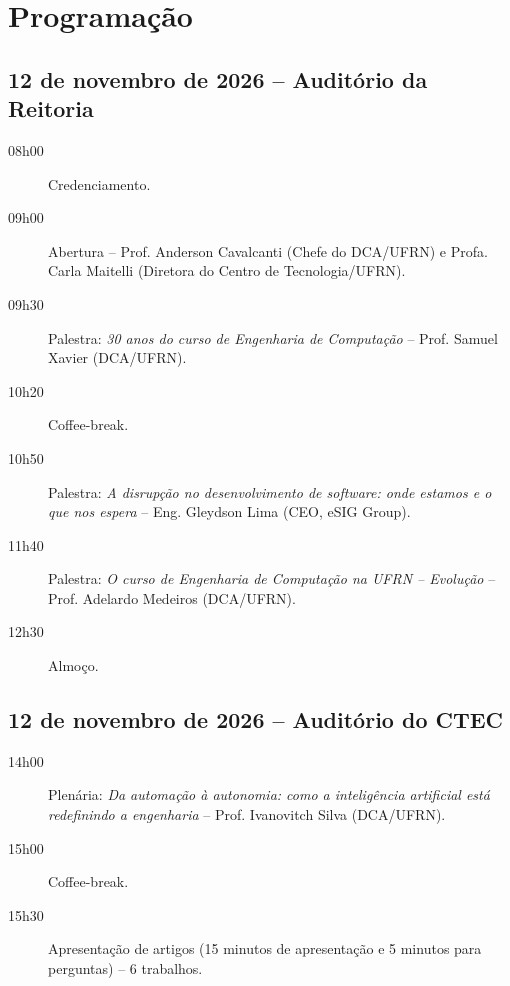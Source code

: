 \documentclass[12pt,a4paper,oneside,openany]{book}
\begin{document}
\chapter*{Programação}


\section*{12 de novembro de 2026 -- Auditório da Reitoria}
\begin{description}
  \item[08h00] Credenciamento.
  \item[09h00] Abertura -- Prof. Anderson Cavalcanti (Chefe do DCA/UFRN) e Profa. Carla Maitelli (Diretora do Centro de Tecnologia/UFRN).
  \item[09h30] Palestra: \textit{30 anos do curso de Engenharia de Computação} -- Prof. Samuel Xavier (DCA/UFRN).
  \item[10h20] Coffee-break.
  \item[10h50] Palestra: \textit{A disrupção no desenvolvimento de software: onde estamos e o que nos espera} -- Eng. Gleydson Lima (CEO, eSIG Group).
  \item[11h40] Palestra: \textit{O curso de Engenharia de Computação na UFRN -- Evolução} -- Prof. Adelardo Medeiros (DCA/UFRN).
  \item[12h30] Almoço.
\end{description}

\section*{12 de novembro de 2026 -- Auditório do CTEC}
\begin{description}
  \item[14h00] Plenária: \textit{Da automação à autonomia: como a inteligência artificial está redefinindo a engenharia} -- Prof. Ivanovitch Silva (DCA/UFRN).
  \item[15h00] Coffee-break.
  \item[15h30] Apresentação de artigos (15 minutos de apresentação e 5 minutos para perguntas) -- 6 trabalhos.
\end{description}
\end{document}
